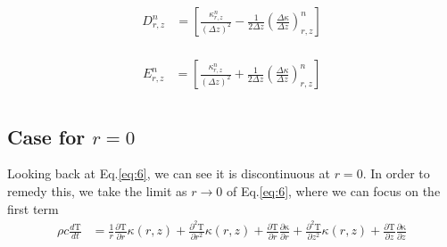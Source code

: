 \documentclass[12pt]{article}
\begin{document}
		\begin{equation}
		\begin{aligned}
		D^n_{r, z} &= \left [\frac{\kappa^n_{r, z}}{(\Delta z)^2} - \frac{1}{2\Delta z}(\frac{\Delta\kappa}{\Delta z})^n_{r, z}  \right ] \\
		\end{aligned}
		\end{equation}
		
		\begin{equation}
		\begin{aligned}
		E^n_{r, z} &= \left [ \frac{\kappa^n_{r, z}}{(\Delta z)^2} + \frac{1}{2\Delta z}(\frac{\Delta\kappa}{\Delta z})^n_{r, z} \right ] \\
		\end{aligned}
		\end{equation}

    \subsection{Case for $r=0$}
      Looking back at Eq.\ref{eq:6}, we can see it is discontinuous at $r=0$. In order to remedy this, we take the limit as $r\rightarrow0$ of Eq.\ref{eq:6}, where we can focus on the first term
      \begin{equation}
        \begin{aligned}
          \rho c \frac{d\mathrm{T}}{dt} &= \frac{1}{r} \frac{\partial\mathrm{T}}{\partial r}\kappa(r, z) + \frac{\partial^2\mathrm{T}}{\partial r^2}\kappa(r, z)  + \frac{\partial\mathrm{T}}{\partial r} \frac{\partial\mathrm{\kappa}}{\partial r}  + \frac{\partial^2\mathrm{T}}{\partial z^2}\kappa(r, z) + \frac{\partial\mathrm{T}}{\partial z}\frac{\partial\mathrm{\kappa}}{\partial z} \\
        \end{aligned}
      \end{equation}	
\end{document}
